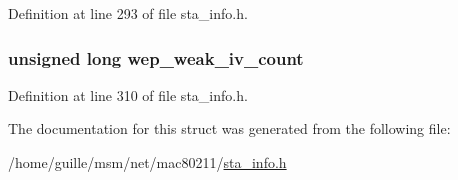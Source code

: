 Definition at line 293 of file sta\-\_\-info.\-h.

\hypertarget{structsta__info_a9eda8cff20a9c485782549583ccaac14}{
\subsubsection[{wep\-\_\-weak\-\_\-iv\-\_\-count}]{\setlength{\rightskip}{0pt plus 5cm}unsigned long wep\-\_\-weak\-\_\-iv\-\_\-count}}\label{structsta__info_a9eda8cff20a9c485782549583ccaac14}


Definition at line 310 of file sta\-\_\-info.\-h.



The documentation for this struct was generated from the following file\-:\begin{DoxyCompactItemize}
\item 
/home/guille/msm/net/mac80211/\hyperlink{sta__info_8h}{sta\-\_\-info.\-h}\end{DoxyCompactItemize}
